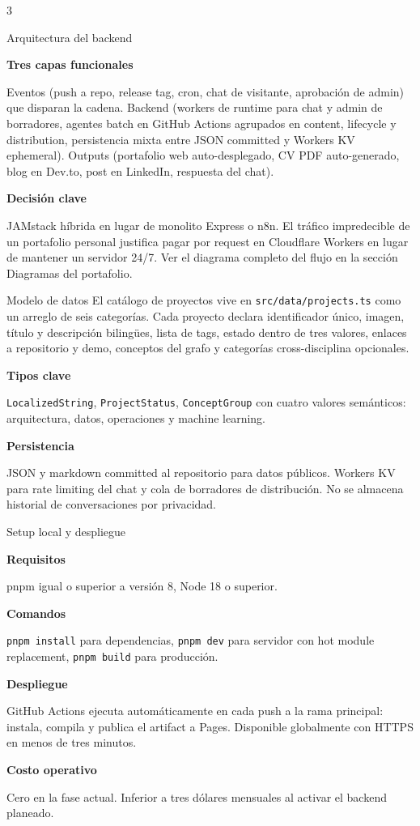 \documentclass[10pt]{article}
\newcommand{\posterheading}[1]{%
  \vspace{4pt}%
  \par{\color{accentdark}\sffamily\bfseries #1}\par
  \vspace{2pt}%
}
\begin{document}
\begin{multicols}{3}
\begin{posterblock}{Arquitectura del backend}
\posterheading{Tres capas funcionales}
Eventos (push a repo, release tag, cron, chat de visitante, aprobación de admin) que disparan la cadena. Backend (workers de runtime para chat y admin de borradores, agentes batch en GitHub Actions agrupados en content, lifecycle y distribution, persistencia mixta entre JSON committed y Workers KV ephemeral). Outputs (portafolio web auto-desplegado, CV PDF auto-generado, blog en Dev.to, post en LinkedIn, respuesta del chat).

\posterheading{Decisión clave}
JAMstack híbrida en lugar de monolito Express o n8n. El tráfico impredecible de un portafolio personal justifica pagar por request en Cloudflare Workers en lugar de mantener un servidor 24/7. Ver el diagrama completo del flujo en la sección Diagramas del portafolio.
\end{posterblock}

\begin{posterblock}{Modelo de datos}
El catálogo de proyectos vive en \texttt{src/data/projects.ts} como un arreglo de seis categorías. Cada proyecto declara identificador único, imagen, título y descripción bilingües, lista de tags, estado dentro de tres valores, enlaces a repositorio y demo, conceptos del grafo y categorías cross-disciplina opcionales.

\posterheading{Tipos clave}
\texttt{LocalizedString}, \texttt{ProjectStatus}, \texttt{ConceptGroup} con cuatro valores semánticos: arquitectura, datos, operaciones y machine learning.

\posterheading{Persistencia}
JSON y markdown committed al repositorio para datos públicos. Workers KV para rate limiting del chat y cola de borradores de distribución. No se almacena historial de conversaciones por privacidad.
\end{posterblock}

\begin{posterblock}{Setup local y despliegue}
\posterheading{Requisitos}
pnpm igual o superior a versión 8, Node 18 o superior.

\posterheading{Comandos}
\texttt{pnpm install} para dependencias, \texttt{pnpm dev} para servidor con hot module replacement, \texttt{pnpm build} para producción.

\posterheading{Despliegue}
GitHub Actions ejecuta automáticamente en cada push a la rama principal: instala, compila y publica el artifact a Pages. Disponible globalmente con HTTPS en menos de tres minutos.

\posterheading{Costo operativo}
Cero en la fase actual. Inferior a tres dólares mensuales al activar el backend planeado.
\end{posterblock}

\end{multicols}
\end{document}
